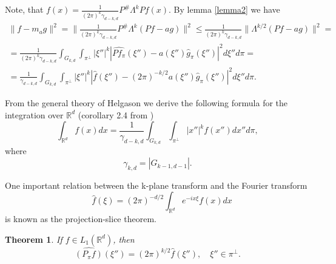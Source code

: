 \documentclass[12pt]{iopart}
\newtheorem{theorem}{Theorem}
\begin{document}
Note, that $f(x)=\frac{1}{(2\pi)^k\gamma_{d-k,d}}P^\#\Lambda^kPf(x)$.
By lemma \ref{lemma2} we have
\begin{multline*}
    \|f-m_ag\|^2=\|\frac{1}{(2\pi)^k\gamma_{d-k,d}}P^\#\Lambda^k(Pf-ag)\|^2\le\frac{1}{(2\pi)^k\gamma_{d-k,d}}\|\Lambda^{k/2}(Pf-ag)\|^2=\\
    =\frac{1}{(2\pi)^k\gamma_{d-k,d}}\int_{G_{k,d}}\int_{\pi^\perp}|\xi''|^k\left|\widehat{Pf_\pi}(\xi'')-a(\xi'')\widehat g_\pi(\xi'')\right|^2d\xi'' d\pi=\\
    =\frac{1}{\gamma_{d-k,d}}\int_{G_{k,d}}\int_{\pi^\perp}|\xi''|^k\left|\widehat{f}(\xi'')-(2\pi)^{-k/2}a(\xi'')\widehat g_\pi(\xi'')\right|^2d\xi'' d\pi.
\end{multline*}







From the general theory of Helgason \cite{H} we derive the following formula for the integration over $\mathbb R^d$ (corollary 2.4 from \cite{K})
\begin{equation}
\label{integral}
\int_{\mathbb R^d}f(x)dx=\frac{1}{\gamma_{d-k,d}}\int_{G_{k,d}}\int_{\pi^\perp}|x''|^kf(x'')dx''d\pi,
\end{equation}
where
$$
\gamma_{k,d}=|G_{k-1,d-1}|.
$$

One important relation between the k-plane transform and the Fourier transform
$$\quad \widehat f(\xi)=(2\pi)^{-d/2}\int_{\mathbb R^d}e^{-ix\xi}f(x)dx$$
is  known as the projection-slice theorem. 

\begin{theorem}
\label{projection}
If $f\in L_1(\mathbb R^d)$, then
$$\widehat{(P_\pi f)}(\xi'')=(2\pi)^{k/2}\widehat f(\xi''),\quad \xi''\in\pi^\perp.$$
\end{theorem}
\end{document}
